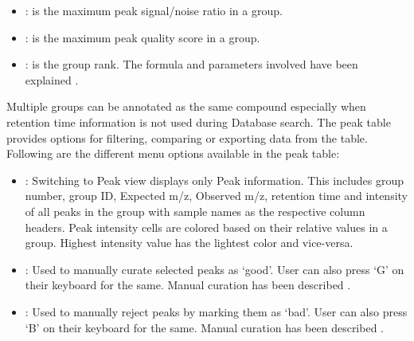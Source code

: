 \documentclass[letterpaper,10pt,english,openany,oneside]{sphinxmanual}
\begin{document}
\begin{itemize}
\item {} 
: is the maximum peak signal/noise ratio in a group.

\item {} 
: is the maximum peak quality score in a group.

\item {} 
: is the group rank. The formula and parameters involved have been explained .

\end{itemize}



Multiple groups can be annotated as the same compound especially when retention time information is not used during Database search. The peak table provides options for filtering, comparing or exporting data from the table. Following are the different menu options available in the peak table:
\begin{itemize}
\item {} 
 : Switching to Peak view displays only Peak information. This includes group number, group ID, Expected m/z, Observed m/z, retention time and intensity of all peaks in the group with sample names as the respective column headers. Peak intensity cells are colored based on their relative values in a group. Highest intensity value has the lightest color and vice-versa.

\end{itemize}

\begin{itemize}
\item {} 
 : Used to manually curate selected peaks as ‘good’. User can also press ‘G’ on their keyboard for the same. Manual curation has been described .

\end{itemize}

\begin{itemize}
\item {} 
 : Used to manually reject peaks by marking them as ‘bad’. User can also press ‘B’ on their keyboard for the same. Manual curation has been described .

\end{itemize}
\end{document}
